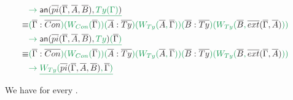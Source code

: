 \begin{example}
\begin{align*}
{} \\
& \grm{
	\to \underline{\anntwo{\overline{pi}(\overline{\Gamma}, \overline{A}, \overline{B})}{\mathop{Ty}(\Gamma)}}
} \\
\equiv & \grm{
	(\blm{\overline{\Gamma} : \overline{Con}})(W_{\mathop{Con}}(\blm{\overline{\Gamma}}))
	(\blm{\overline{A} : \overline{Ty}})(W_{\mathop{Ty}}(\blm{\overline{A}}, \blm{\overline{\Gamma}}))
	(\blm{\overline{B} : \overline{Ty}})(W_{\mathop{Ty}}(\blm{\overline{B}}, \blm{\overline{ext}(\overline{\Gamma}, \overline{A})}))
} \\
& \grm{
	\to \underline{\anntwo{\overline{pi}(\overline{\Gamma}, \overline{A}, \overline{B})}{\mathop{Ty}}(\blm{\overline{\Gamma}})}
} \\
\equiv & \grm{
	(\blm{\overline{\Gamma} : \overline{Con}})(W_{\mathop{Con}}(\blm{\overline{\Gamma}}))
	(\blm{\overline{A} : \overline{Ty}})(W_{\mathop{Ty}}(\blm{\overline{A}}, \blm{\overline{\Gamma}}))
	(\blm{\overline{B} : \overline{Ty}})(W_{\mathop{Ty}}(\blm{\overline{B}}, \blm{\overline{ext}(\overline{\Gamma}, \overline{A})}))
} \\
& \grm{ \hspace*{0pt}\hfill
	\to \underline{W_{\mathop{Ty}}(\blm{\overline{pi}(\overline{\Gamma}, \overline{A}, \overline{B})},\blm{\overline{\Gamma}})}
} 
\end{align*}
\end{example}

\begin{lemma}
We have \grm{\vdash \annotate{\Gamma}} for every \grm{\vdash \Gamma}.
\end{lemma}


